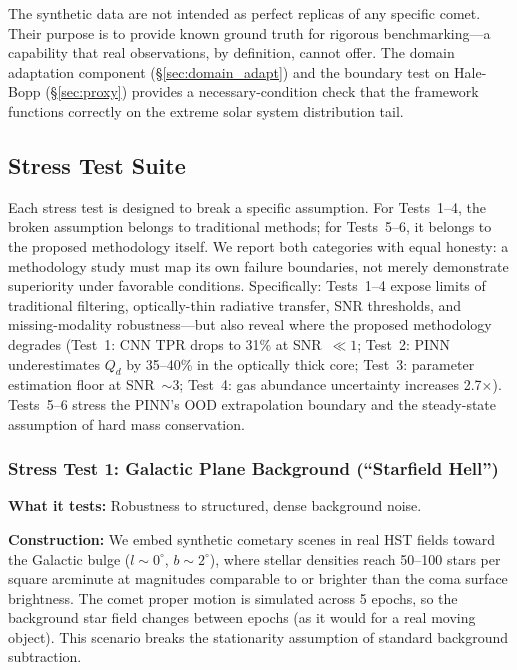 \documentclass[usenatbib]{mnras}
\begin{document}
 The synthetic data are not intended as perfect replicas of any specific comet. Their purpose is to provide known ground truth for rigorous benchmarking---a capability that real observations, by definition, cannot offer. The domain adaptation component (\S\ref{sec:domain_adapt}) and the boundary test on Hale-Bopp (\S\ref{sec:proxy}) provides a necessary-condition check that the framework functions correctly on the extreme solar system distribution tail.

\subsection{Stress Test Suite}\label{sec:stress}

Each stress test is designed to break a specific assumption. For Tests~1--4, the broken assumption belongs to traditional methods; for Tests~5--6, it belongs to the proposed methodology itself. We report both categories with equal honesty: a methodology study must map its own failure boundaries, not merely demonstrate superiority under favorable conditions. Specifically: Tests~1--4 expose limits of traditional filtering, optically-thin radiative transfer, SNR thresholds, and missing-modality robustness---but also reveal where the proposed methodology degrades (Test~1: CNN TPR drops to 31\% at SNR~$\ll 1$; Test~2: PINN underestimates $Q_d$ by 35--40\% in the optically thick core; Test~3: parameter estimation floor at SNR~$\sim$3; Test~4: gas abundance uncertainty increases 2.7$\times$). Tests~5--6 stress the PINN's OOD extrapolation boundary and the steady-state assumption of hard mass conservation.

\subsubsection{Stress Test 1: Galactic Plane Background (``Starfield Hell'')}

\textbf{What it tests:} Robustness to structured, dense background noise.

\textbf{Construction:} We embed synthetic cometary scenes in real HST fields toward the Galactic bulge ($l \sim 0^\circ$, $b \sim 2^\circ$), where stellar densities reach 50--100 stars per square arcminute at magnitudes comparable to or brighter than the coma surface brightness. The comet proper motion is simulated across 5 epochs, so the background star field changes between epochs (as it would for a real moving object). This scenario breaks the stationarity assumption of standard background subtraction.
\end{document}
